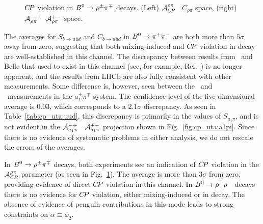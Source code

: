 \begin{figure}[htb]
\begin{center}
{    }
  \end{center}
  \vspace{-0.8cm}
  \caption{
    $C\!P$ violation in $B^0\to\rho^\pm\pi^\mp$ decays.
    (Left) ${\cal A}^{\rho\pi}_{C\!P}$ \vs\ $C_{\rho\pi}$ space,
    (right) ${\cal A}^{-+}_{\rho\pi}$ \vs\ ${\cal A}^{+-}_{\rho\pi}$ space.
  }
  \label{fig:cp_uta:uud:rhopi-dircp}
\end{figure}

The averages for $S_{b \to u\bar u d}$ and $C_{b \to u\bar u d}$ 
in $B^0 \to \pi^+\pi^-$ are both more than $5\sigma$ away from zero,
suggesting that both mixing-induced and $C\!P$ violation in decay
are well-established in this channel.
The discrepancy between results from \babar\ and Belle that used to exist in
this channel (see, for example, Ref.~\cite{Asner:2010qj}) is no longer
apparent, and the results from LHCb are also fully consistent with other
measurements.  
Some difference is, however, seen between the \babar\ and \belle\ measurements
in the $a_1^\pm\pi^\mp$ system. 
The confidence level of the five-dimensional average is $0.03$,
which corresponds to a $2.1\sigma$ discrepancy.  
As seen in Table~\ref{tab:cp_uta:uud}, this discrepancy is primarily in the
values of $S_{a_1\pi}$, and is not evident in the ${\cal A}^{-+}_{a_1\pi}$
\vs\ ${\cal A}^{+-}_{a_1\pi}$ projection shown in Fig.~\ref{fig:cp_uta:a1pi}.
Since there is no
evidence of systematic problems in either analysis,
we do not rescale the errors of the averages.

In $B^0 \to \rho^\pm\pi^\mp$ decays,
both experiments see an indication of $C\!P$ violation in the 
${\cal A}^{\rho\pi}_{C\!P}$ parameter 
(as seen in Fig.~\ref{fig:cp_uta:uud:rhopi-dircp}).
The average is more than $3\sigma$ from zero,
providing evidence of direct $C\!P$ violation in this channel.
In $B^0 \to \rho^+\rho^-$ decays there is no evidence for $C\!P$ violation,
either mixing-induced or in decay.
The absence of evidence of penguin contributions in this mode leads to
strong constraints on $\alpha \equiv \phi_2$.

\label{sec:cp_uta:cus:alpha}

